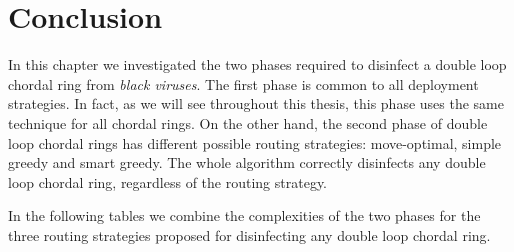 \begin{comment}

\begin{theorem}\label{loop_free2}
In any double loop chordal ring $C_n(1,k)$,  our smart Greedy strategy does the routing correctly with no infinite loops. 
\end{theorem}
\begin{proof}
Follows the same proof as \ref{loop_free}.
\end{proof}

\end{comment}
\section{Conclusion}  
In this chapter we investigated the two phases required to disinfect a double loop chordal ring from {\it black viruses}.  
The first phase is common to all deployment strategies. In fact, as we will see throughout this thesis, this phase uses the same technique for all chordal rings. On the other hand, the second phase of double loop chordal rings has different possible routing strategies: move-optimal, simple greedy and smart greedy. The whole algorithm correctly disinfects any double loop chordal ring, regardless of the routing strategy.

%
In the following tables we combine the complexities of the two phases for the three routing strategies proposed for disinfecting any double loop chordal ring.

